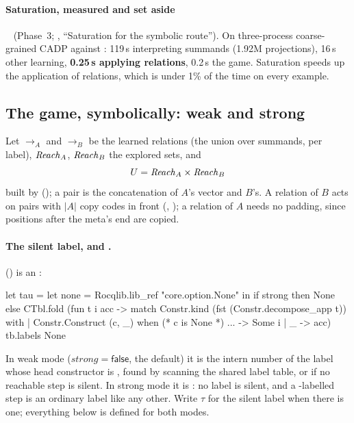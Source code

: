 \paragraph{Saturation, measured and set aside}~\cite{ciardo01} (Phase~3; ,
``Saturation for the symbolic route''). On three-process coarse-grained CADP
against : 119\,s interpreting summands (1.92M projections),
16\,s other learning, \textbf{0.25\,s applying relations}, 0.2\,s the
game. Saturation speeds up the application of relations, which is under
1\% of the time on every example.

\subsection{The game, symbolically: weak and strong}\label{sec:sym-game}

Let $\to_A$ and $\to_B$ be the learned relations (the union over
summands, per label), $\mathit{Reach}_A$, $\mathit{Reach}_B$ the explored sets, and
\[
U = \mathit{Reach}_A \times \mathit{Reach}_B
\]
built by  (); a pair is the
concatenation of $A$'s vector and $B$'s. A relation of $B$ acts on pairs
with $|A|$ copy codes in front (,
); a relation of $A$ needs no padding,
since positions after the meta's end are copied.

\paragraph{The silent label, and .} 
() is an :
\begin{ocaml}
  let tau =
    let none = Rocqlib.lib_ref "core.option.None" in
    if strong
    then None
    else
      CTbl.fold (fun t i acc -> match Constr.kind (fst (Constr.decompose_app t)) with
        | Constr.Construct (c, _) when (* c is None *) ... -> Some i
        | _ -> acc) tb.labels None
\end{ocaml}
In weak mode ($\mathit{strong}=\mathsf{false}$, the default) it is the
intern number of the label whose head constructor is , found by
scanning the shared label table, or  if no reachable step is
silent. In strong mode it
is : no label is silent, and a -labelled step is an
ordinary label like any other. Write $\tau$ for the silent label when
there is one; everything below is defined for both modes.

